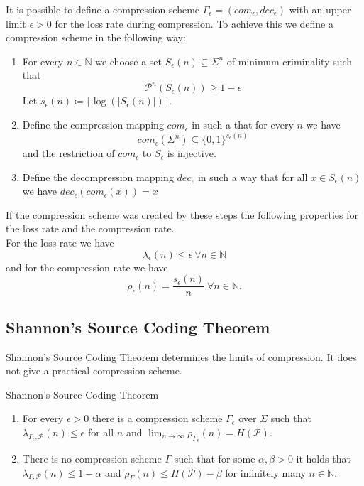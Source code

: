 \documentclass[english]{panikzettel}
\begin{document}
It is possible to define a compression scheme $\Gamma_\epsilon=(com_\epsilon, dec_\epsilon)$ with an upper limit $\epsilon>0$ for the loss rate during compression. To achieve this we define a compression scheme in the following way:
\begin{enumerate}
\item For every $n\in\mathbb{N}$ we choose a set $S_\epsilon(n)\subseteq \Sigma^n$ of minimum criminality such that
\[
\mathcal{P}^n(S_\epsilon (n))\geq 1-\epsilon
\]
Let $s_\epsilon(n) \coloneqq \lceil\log (|S_\epsilon(n)|)\rceil$.
\item Define the compression mapping $com_\epsilon$ in such a that for every $n$ we have
\[
com_\epsilon(\Sigma^n)\subseteq \{0,1\}^{s_\epsilon(n)}
\]
and the restriction of $com_\epsilon$ to $S_\epsilon$ is injective.
\item Define the decompression mapping $dec_\epsilon$ in such a way that for all $x\in S_\epsilon(n)$ we have $dec_\epsilon(com_\epsilon(x))=x$
\end{enumerate}

If the compression scheme was created by these steps the following properties for the loss rate and the compression rate.\\
For the loss rate we have
\[
\lambda_\epsilon(n)\leq \epsilon \ \forall n\in\mathbb{N}
\]
and for the compression rate we have
\[
\rho_\epsilon(n)=\frac{s_\epsilon(n)}{n} \ \forall n\in\mathbb{N}.
\]


\subsection{Shannon’s Source Coding Theorem}
Shannon’s Source Coding Theorem determines the limits of compression. It does not give a practical compression scheme.

\begin{theo}{Shannon’s Source Coding Theorem}
\begin{enumerate}[leftmargin=*]
\item For every $\epsilon>0$ there is a compression scheme $\Gamma_\epsilon$ over $\Sigma$ such that $\lambda_{\Gamma_\epsilon, \mathcal{P}}(n)\leq \epsilon$ for all $n$ and $\lim_{n\to \infty}\rho_{\Gamma_\epsilon}(n)=H(\mathcal{P})$.
\item There is no compression scheme $\Gamma$ such that for some $\alpha,\beta>0$ it holds that $\lambda_{\Gamma, \mathcal{P}}(n)\leq 1-\alpha$ and $\rho_\Gamma(n)\leq H(\mathcal{P})-\beta$ for infinitely many $n\in \mathbb{N}$.
\end{enumerate}
\end{theo}
\end{document}
